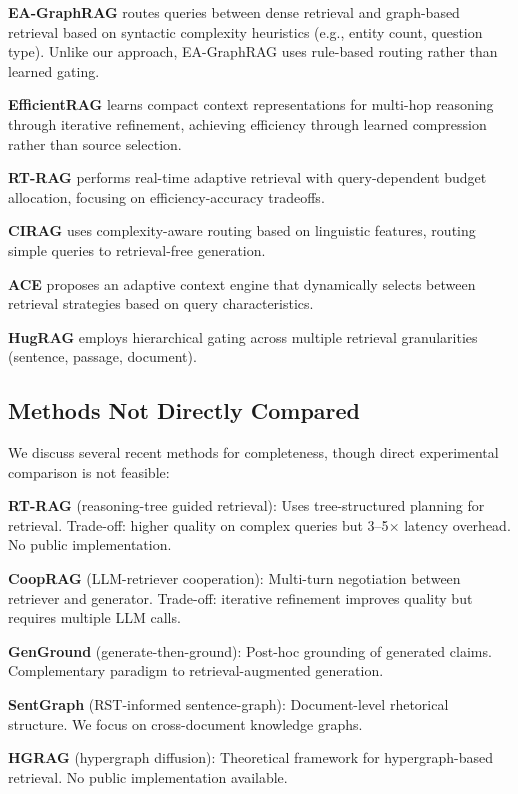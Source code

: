 \documentclass[10pt,twocolumn]{article}
\begin{document}
\textbf{EA-GraphRAG} \cite{li2024eagraphrag} routes queries between dense retrieval and graph-based retrieval based on syntactic complexity heuristics (e.g., entity count, question type). Unlike our approach, EA-GraphRAG uses rule-based routing rather than learned gating.

\textbf{EfficientRAG} \cite{chen2024efficientrag} learns compact context representations for multi-hop reasoning through iterative refinement, achieving efficiency through learned compression rather than source selection.

\textbf{RT-RAG} \cite{wang2024rtrag} performs real-time adaptive retrieval with query-dependent budget allocation, focusing on efficiency-accuracy tradeoffs.

\textbf{CIRAG} \cite{zhang2024cirag} uses complexity-aware routing based on linguistic features, routing simple queries to retrieval-free generation.

\textbf{ACE} \cite{liu2024ace} proposes an adaptive context engine that dynamically selects between retrieval strategies based on query characteristics.

\textbf{HugRAG} \cite{yang2024hugrag} employs hierarchical gating across multiple retrieval granularities (sentence, passage, document).

\subsection{Methods Not Directly Compared}
\label{sec:not_compared}

We discuss several recent methods for completeness, though direct experimental comparison is not feasible:

\textbf{RT-RAG} (reasoning-tree guided retrieval): Uses tree-structured planning for retrieval. Trade-off: higher quality on complex queries but 3--5$\times$ latency overhead. No public implementation.

\textbf{CoopRAG} (LLM-retriever cooperation): Multi-turn negotiation between retriever and generator. Trade-off: iterative refinement improves quality but requires multiple LLM calls.

\textbf{GenGround} (generate-then-ground): Post-hoc grounding of generated claims. Complementary paradigm to retrieval-augmented generation.

\textbf{SentGraph} (RST-informed sentence-graph): Document-level rhetorical structure. We focus on cross-document knowledge graphs.

\textbf{HGRAG} (hypergraph diffusion): Theoretical framework for hypergraph-based retrieval. No public implementation available.
\end{document}
